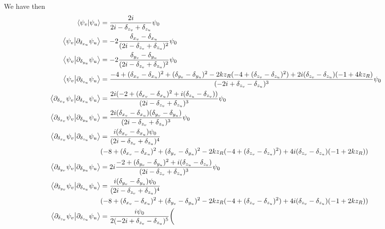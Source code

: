 \documentclass[reprint,amsmath,amssymb,aps,prl,floatfix,groupedaddress,superscriptaddress]{revtex4-2}
\begin{document}
We have then
\begin{align}
    \braket{\psi_v}{\psi_u} &= \frac{2 i}{2 i  - \delta_{z_v} + \delta_{z_u}} \psi_0 \\
    \braket{\psi_v}{\partial_{\delta_{x_u}}\psi_u} &=  -2 \frac{\delta_{x_v} - \delta_{x_u}}{(2i - \delta_{z_v} + \delta_{z_u})^2} \psi_0\\
    \braket{\psi_v}{\partial_{\delta_{y_u}}\psi_u} &=  -2 \frac{\delta_{y_v} - \delta_{y_u}}{(2i - \delta_{z_v} + \delta_{z_u})^2} \psi_0\\
    \braket{\psi_v}{\partial_{\delta_{z_u}}\psi_u} &= \frac{-4 + (\delta_{x_v} - \delta_{x_u})^2 + (\delta_{y_v} - \delta_{y_u})^2 - 2 k z_R (-4 + (\delta_{z_v} - \delta_{z_u})^2) +  2i (\delta_{z_v} - \delta_{z_u})  (-1 + 4 k z_R)
    }{(-2i + \delta_{z_v} - \delta_{z_u})^3} \psi_0 \\
    \braket{\partial_{\delta_{x_v}}\psi_v}{\partial_{\delta_{x_u}}\psi_u} &= \frac{2i (-2 + (\delta_{x_v} - \delta_{x_u})^2 + i (\delta_{z_u} - \delta_{z_v}))}{(2i - \delta_{z_v} + \delta_{z_u})^3} \psi_0 \\
    \braket{\partial_{\delta_{x_v}}\psi_v}{\partial_{\delta_{y_u}}\psi_u} &= \frac{2i (\delta_{x_v} - \delta_{x_u}) (\delta_{y_v} - \delta_{y_u})}{ (2i - \delta_{z_v} + \delta_{z_u})^3} \psi_0 \\
    \braket{\partial_{\delta_{x_v}}\psi_v}{\partial_{\delta_{z_u}}\psi_u} &= \frac{i (\delta_{x_v} - \delta_{x_u}) \psi_0}{(2i - \delta_{z_v} + \delta_{z_u})^4} \\
    &(-8 + (\delta_{x_v} - \delta_{x_u})^2 + (\delta_{y_v} - \delta_{y_u})^2  - 2 k z_R (-4 + (\delta_{z_v} - \delta_{z_u})^2) + 4i (\delta_{z_v} - \delta_{z_u}) (-1 + 2 k z_R)) \nonumber \\
    \braket{\partial_{\delta_{y_v}}\psi_v}{\partial_{\delta_{y_u}}\psi_u} &= 2i \frac{-2 + (\delta_{y_v} - \delta_{y_u})^2 + i (\delta_{z_u} - \delta_{z_v})}{ (2i - \delta_{z_v} + \delta_{z_u})^3} \psi_0\\
    \braket{\partial_{\delta_{y_v}}\psi_v}{\partial_{\delta_{z_u}}\psi_u} &= \frac{i (\delta_{y_v} - \delta_{y_u}) \psi_0}{(2i - \delta_{z_v} + \delta_{z_u})^4}  \\
    & (-8 + (\delta_{x_v} - \delta_{x_u})^2 + (\delta_{y_v} - \delta_{y_u})^2 - 2 k z_R (-4 + (\delta_{z_v} - \delta_{z_u})^2) + 4i (\delta_{z_v} - \delta_{z_u}) (-1 + 2 k z_R)) \nonumber \\
    \braket{\partial_{\delta_{z_v}}\psi_v}{\partial_{\delta_{z_u}}\psi_u} &= \frac{i \psi_0}{2 (-2i + \delta_{z_v} - \delta_{z_u})^5} \bigg(  \\

\end{align}
\end{document}
